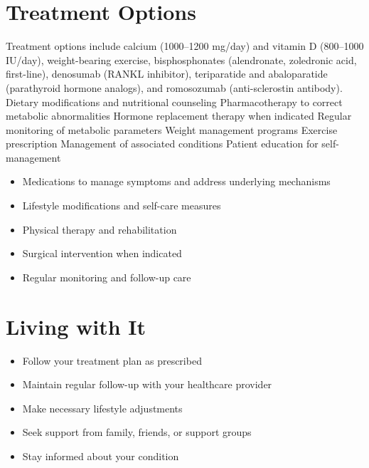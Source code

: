 \section{Treatment Options}
Treatment options include calcium (1000--1200 mg/day) and vitamin D (800--1000 IU/day), weight-bearing exercise, bisphosphonates (alendronate, zoledronic acid, first-line), denosumab (RANKL inhibitor), teriparatide and abaloparatide (parathyroid hormone analogs), and romosozumab (anti-sclerostin antibody). Dietary modifications and nutritional counseling Pharmacotherapy to correct metabolic abnormalities Hormone replacement therapy when indicated Regular monitoring of metabolic parameters Weight management programs Exercise prescription Management of associated conditions Patient education for self-management

\begin{itemize}[noitemsep]
  \item Medications to manage symptoms and address underlying mechanisms
  \item Lifestyle modifications and self-care measures
  \item Physical therapy and rehabilitation
  \item Surgical intervention when indicated
  \item Regular monitoring and follow-up care
\end{itemize}
\section{Living with It}
\begin{itemize}[noitemsep]
  \item Follow your treatment plan as prescribed
  \item Maintain regular follow-up with your healthcare provider
  \item Make necessary lifestyle adjustments
  \item Seek support from family, friends, or support groups
  \item Stay informed about your condition
\end{itemize}
